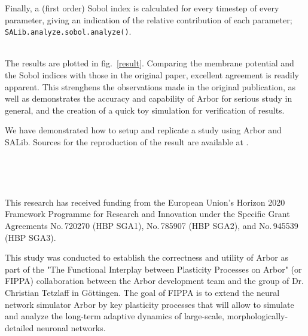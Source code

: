 \documentclass{beamer}
\begin{document}
\begin{frame}[t, fragile]
\begin{columns}[onlytextwidth]
\begin{column}{.49\linewidth}
      Finally, a (first order) Sobol index is calculated for every timestep of every parameter, giving an indication of the relative contribution of each parameter;
      \texttt{SALib.analyze.sobol.analyze()}.
      
      \vspace*{1ex}
      \textbf{}\\
      
      The results are plotted in fig.~\ref{result}. Comparing the membrane potential
      and the Sobol indices with those in the original
      paper, excellent agreement is readily apparent. This strenghens the observations
      made in the original publication, as well as demonstrates the accuracy and 
      capability of Arbor for serious study in general, and the creation of a quick 
      toy simulation for verification of results.

      We have demonstrated how to setup and replicate a study using Arbor and SALib. Sources for the reproduction of the result are available at \cite{thisposter}.

      \vspace*{1ex}
      \textbf{}\\
      \renewcommand*{\bibfont}{\footnotesize}
      {\footnotesize \printbibliography{} }
      \vfill

      \textbf{}\\
      {\footnotesize This research has received funding from the European Union's Horizon 2020
      Framework Programme for Research and Innovation under the Specific Grant
      Agreements No.\,720270 (HBP SGA1), No.\,785907 (HBP SGA2), and No.\,945539
      (HBP SGA3).
      
      This study was conducted to establish the correctness and utility of Arbor as part of the "The Functional Interplay between Plasticity Processes on Arbor" (or FIPPA) collaboration between the Arbor development team and the group of Dr. Christian Tetzlaff in Göttingen. The goal of FIPPA is to extend the neural network simulator Arbor by key plasticity processes that will allow to simulate and analyze the long-term adaptive dynamics of large-scale, morphologically-detailed neuronal networks.}
    \end{column}
  \end{columns}

  
\end{frame}
\end{document}
